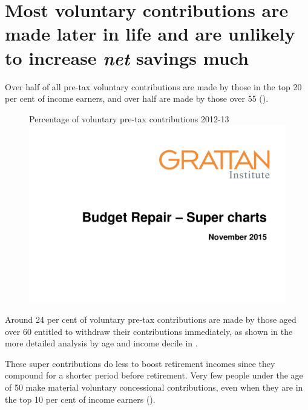 \section{Most voluntary contributions are made later in life and are unlikely to increase \emph{net} savings much\label{sec:SUPER-4-3}}
Over half of all pre-tax voluntary contributions are made by those in the top 20 per cent of income earners, and over half are made by those over 55 ().\DEVIATION{} 
\begin{figure}
%
{Percentage of voluntary pre-tax contributions 2012-13}\label{fig:SUPER-4-5}
\includegraphics[width=\columnwidth,page=23]{super-atlas/PPTX.pdf}

\end{figure}

Around 24 per cent of voluntary pre-tax contributions are made by those aged over 60 entitled to withdraw their contributions immediately, as shown in the more detailed analysis by age and income decile in .

These super contributions do less to boost retirement incomes since they compound for a shorter period before retirement. Very few people under the age of 50 make material voluntary concessional contributions, even when they are in the top 10 per cent of income earners ().

